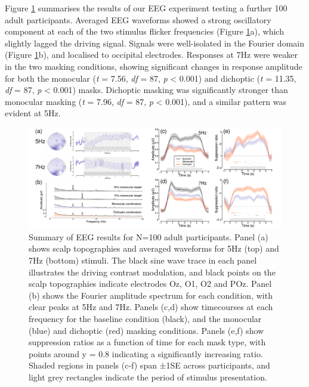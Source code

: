 \documentclass[
]{article}
\begin{document}
Figure \ref{fig:EEGdata} summarises the results of our EEG experiment testing a further 100 adult participants. Averaged EEG waveforms showed a strong oscillatory component at each of the two stimulus flicker frequencies (Figure \ref{fig:EEGdata}a), which slightly lagged the driving signal. Signals were well-isolated in the Fourier domain (Figure \ref{fig:EEGdata}b), and localised to occipital electrodes. Responses at 7Hz were weaker in the two masking conditions, showing significant changes in response amplitude for both the monocular (\emph{t} = 7.56, \emph{df} = 87, \emph{p} \textless{} 0.001) and dichoptic (\emph{t} = 11.35, \emph{df} = 87, \emph{p} \textless{} 0.001) masks. Dichoptic masking was significantly stronger than monocular masking (\emph{t} = 7.96, \emph{df} = 87, \emph{p} \textless{} 0.001), and a similar pattern was evident at 5Hz.

\begin{figure}

{\centering \includegraphics{Figures/EEGdata} 

}

\caption{Summary of EEG results for N=100 adult participants. Panel (a) shows scalp topographies and averaged waveforms for 5Hz (top) and 7Hz (bottom) stimuli. The black sine wave trace in each panel illustrates the driving contrast modulation, and black points on the scalp topographies indicate electrodes Oz, O1, O2 and POz. Panel (b) shows the Fourier amplitude spectrum for each condition, with clear peaks at 5Hz and 7Hz. Panels (c,d) show timecourses at each frequency for the baseline condition (black), and the monocular (blue) and dichoptic (red) masking conditions. Panels (e,f) show suppression ratios as a function of time for each mask type, with points around y = 0.8 indicating a significantly increasing ratio. Shaded regions in panels (c-f) span ±1SE across participants, and light grey rectangles indicate the period of stimulus presentation.}\label{fig:EEGdata}
\end{figure}
\end{document}
